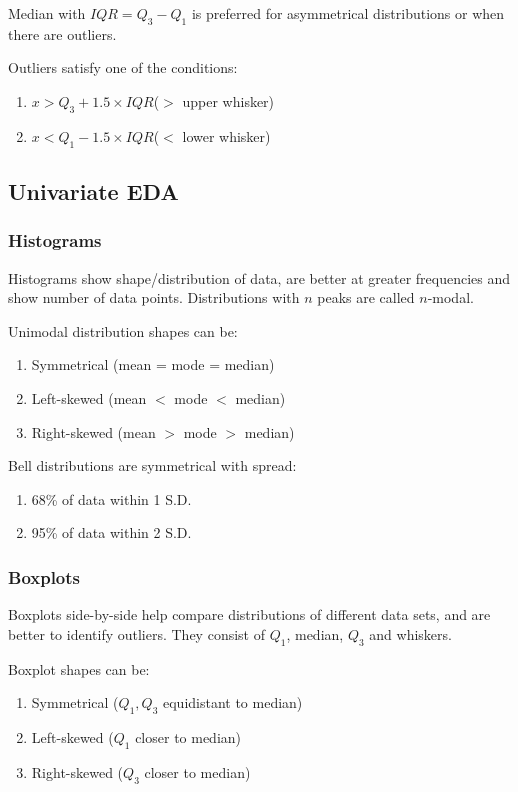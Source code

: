 \documentclass[12pt, a4paper]{article}
\begin{document}
\begin{multicols*}{3}
Median with $IQR = Q_3 - Q_1$ is preferred for asymmetrical distributions or when there are outliers.

Outliers satisfy one of the conditions:
\begin{enumerate}[\roman*.]
  \item $x > Q_3 + 1.5 \times IQR$\hfill($>$ upper whisker)
  \item $x < Q_1 - 1.5 \times IQR$\hfill($<$ lower whisker)
\end{enumerate}

\subsection{Univariate EDA}
\subsubsection{Histograms}
Histograms show shape/distribution of data, are better at greater frequencies and show number of data points.
Distributions with $n$ peaks are called $n$-modal.

Unimodal distribution shapes can be:
\begin{enumerate}[\roman*.]
  \item Symmetrical \hfill(mean = mode = median)
  \item Left-skewed \hfill(mean $<$ mode $<$ median)
  \item Right-skewed \hfill(mean $>$ mode $>$ median)
\end{enumerate}

Bell distributions are symmetrical with spread:
\begin{enumerate}[\roman*.]
  \item 68\% of data within 1 S.D.
  \item 95\% of data within 2 S.D.
\end{enumerate}
\colbreak
\subsubsection{Boxplots}
Boxplots side-by-side help compare distributions of different data sets, and are better to identify outliers.
They consist of $Q_1$, median, $Q_3$ and whiskers.

Boxplot shapes can be:
\begin{enumerate}[\roman*.]
  \item Symmetrical \hfill($Q_1, Q_3$ equidistant to median)
  \item Left-skewed \hfill($Q_1$ closer to median)
  \item Right-skewed \hfill($Q_3$ closer to median)
\end{enumerate}


\end{multicols*}
\end{document}
